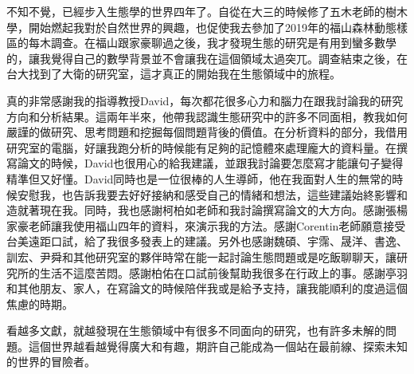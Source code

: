 
\begin{acknowledgement}
	不知不覺，已經步入生態學的世界四年了。自從在大三的時候修了五木老師的樹木學，開始燃起我對於自然世界的興趣，也促使我去參加了2019年的福山森林動態樣區的每木調查。在福山跟家豪聊過之後，我才發現生態的研究是有用到蠻多數學的，讓我覺得自己的數學背景並不會讓我在這個領域太過突兀。調查結束之後，在台大找到了大衛的研究室，這才真正的開始我在生態領域中的旅程。
	
	真的非常感謝我的指導教授David，每次都花很多心力和腦力在跟我討論我的研究方向和分析結果。這兩年半來，他帶我認識生態研究中的許多不同面相，教我如何嚴謹的做研究、思考問題和挖掘每個問題背後的價值。在分析資料的部分，我借用研究室的電腦，好讓我跑分析的時候能有足夠的記憶體來處理龐大的資料量。在撰寫論文的時候，David也很用心的給我建議，並跟我討論要怎麼寫才能讓句子變得精準但又好懂。David同時也是一位很棒的人生導師，他在我面對人生的無常的時候安慰我，也告訴我要去好好接納和感受自己的情緒和想法，這些建議始終影響和造就著現在我。同時，我也感謝柯柏如老師和我討論撰寫論文的大方向。感謝張楊家豪老師讓我使用福山四年的資料，來演示我的方法。感謝Corentin老師願意接受台美遠距口試，給了我很多發表上的建議。另外也感謝魏碩、宇霈、晟洋、書逸、訓宏、尹舜和其他研究室的夥伴時常在能一起討論生態問題或是吃飯聊聊天，讓研究所的生活不這麼苦悶。感謝柏佑在口試前後幫助我很多在行政上的事。感謝亭羽和其他朋友、家人，在寫論文的時候陪伴我或是給予支持，讓我能順利的度過這個焦慮的時期。
	
	看越多文獻，就越發現在生態領域中有很多不同面向的研究，也有許多未解的問題。這個世界越看越覺得廣大和有趣，期許自己能成為一個站在最前線、探索未知的世界的冒險者。

\end{acknowledgement}